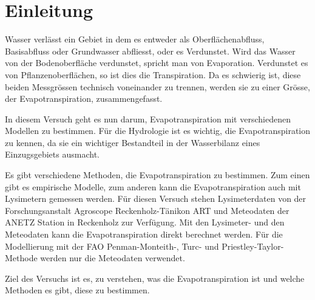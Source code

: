 \section{Einleitung}

Wasser verlässt ein Gebiet in dem es entweder als Oberflächenabfluss, Basisabfluss oder Grundwasser abfliesst, oder es Verdunstet. Wird das Wasser von der Bodenoberfläche verdunstet, spricht man von Evaporation. Verdunstet es von Pflanzenoberflächen, so ist dies die Transpiration. Da es schwierig ist, diese beiden Messgrössen technisch voneinander zu trennen, werden sie zu einer Grösse, der Evapotranspiration, zusammengefasst.

In diesem Versuch geht es nun darum, Evapotranspiration mit verschiedenen Modellen zu bestimmen. Für die Hydrologie ist es wichtig, die Evapotranspiration zu kennen, da sie ein wichtiger Bestandteil in der Wasserbilanz eines Einzugsgebiets ausmacht.

Es gibt verschiedene Methoden, die Evapotranspiration zu bestimmen. Zum einen gibt es empirische Modelle, zum anderen kann die Evapotranspiration auch mit Lysimetern gemessen werden. Für diesen Versuch stehen Lysimeterdaten von der Forschungsanstalt Agroscope Reckenholz-Tänikon ART und Meteodaten der ANETZ Station in Reckenholz zur Verfügung. Mit den Lysimeter- und den Meteodaten kann die Evapotranspiration direkt berechnet werden. Für die Modellierung mit der FAO Penman-Monteith-, Turc- und Priestley-Taylor-Methode werden nur die Meteodaten verwendet.

Ziel des Versuchs ist es, zu verstehen, was die Evapotranspiration ist und welche Methoden es gibt, diese zu bestimmen.